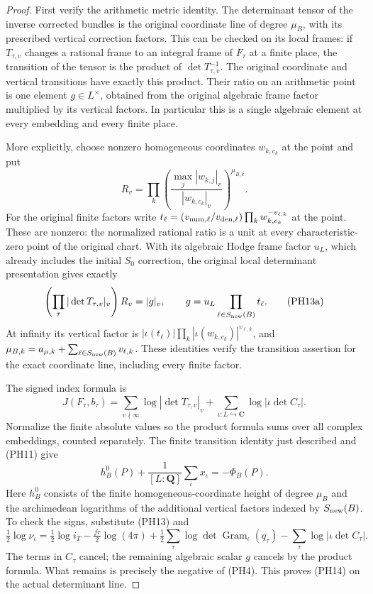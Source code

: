 \begin{proof}
First verify the arithmetic metric identity. The determinant
tensor of the inverse corrected bundles is the original
coordinate line of degree $\mu_B$, with its prescribed vertical
correction factors. This can be checked on its local frames:
if $T_{\tau,v}$ changes a rational frame to an integral frame
of $F_\tau$ at a finite place, the transition of the tensor is
the product of $\det T_{\tau,v}^{-1}$. The original coordinate
and vertical transitions have exactly this product. Their ratio
on an arithmetic point is one element $g\in L^\times$, obtained
from the original algebraic frame factor multiplied by its
vertical factors. In particular this is a single algebraic
element at every embedding and every finite place.

More explicitly, choose nonzero homogeneous coordinates $w_{k,c_k}$
at the point and put
\[
 R_v=\prod_k\left(\frac{\max_j|w_{k,j}|_v}{|w_{k,c_k}|_v}
                         \right)^{\mu_{B,k}}.
\]
For the original finite factors write
$t_\ell=(v_{{\rm num},\ell}/v_{{\rm den},\ell})
\prod_k w_{k,c_k}^{-v_{\ell,k}}$ at the point. These are
nonzero: the normalized rational ratio is a unit at every
characteristic-zero point of the original chart. With its
algebraic Hodge frame factor $u_L$, which already includes the
initial $S_0$ correction, the original local
determinant presentation gives exactly
\[
 \left(\prod_\tau|\det T_{\tau,v}|_v\right)R_v=|g|_v,
 \qquad g=u_L\prod_{\ell\in S_{\rm new}(B)}t_\ell.
 \tag{PH13a}
\]
At infinity its vertical factor is
$|\iota(t_\ell)|\prod_k|\iota(w_{k,c_k})|^{v_{\ell,k}}$,
and $\mu_{B,k}=a_{\mu,k}+\sum_{\ell\in S_{\rm new}(B)}v_{\ell,k}$.
These identities verify the transition assertion for the exact
coordinate line, including every finite factor.

The signed index formula is
\[
 J(F_\tau,b_\tau)
   =\sum_{v\nmid\infty}\log|\det T_{\tau,v}|_v
       +\sum_{\iota:L\hookrightarrow\mathbf C}
                                      \log|\iota\det C_\tau|.
 \tag{PH13}
\]
Normalize the finite absolute values so the product formula
sums over all complex embeddings, counted separately.
The finite transition identity just described and
\textup{(PH11)} give
\[
                    h_B^0(P)+\frac1{[L:\mathbf Q]}
                         \sum_\iota x_\iota=-\Phi_B(P).
 \tag{PH14}
\]
Here $h_B^0$ consists of the finite homogeneous-coordinate height
of degree $\mu_B$ and the archimedean logarithms of the
additional vertical factors indexed by $S_{\rm new}(B)$. To check the signs, substitute
\textup{(PH13)} and
\[
 \tfrac12\log\nu_\iota
  =\tfrac12\log i_T-\tfrac{fr}{2}\log(4\pi)
    +\tfrac12\sum_\tau\log\det\operatorname{Gram}_\iota(q_\tau)
    -\sum_\tau\log|\iota\det C_\tau|.
\]
The terms in $C_\tau$ cancel; the remaining algebraic scalar
$g$ cancels by the product formula. What remains is precisely
the negative of \textup{(PH4)}. This proves
\textup{(PH14)} on the actual determinant line.


\end{proof}
